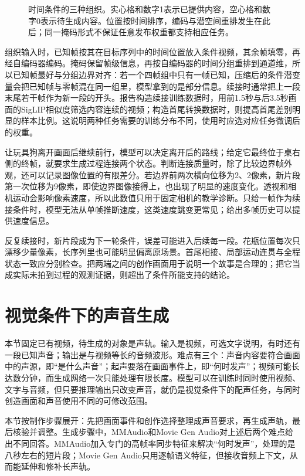 \begin{figure}[htbp]
  \centering
  
  \caption{时间条件的三种组织。实心格和数字1表示已提供内容，空心格和数字0表示待生成内容。位置按时间排序，编码与潜空间重排发生在此后；同一掩码形式不保证任意发布权重都支持相应任务。}
  \label{fig:vision-time-masks}
\end{figure}
\FloatBarrier

组织输入时，已知帧按其在目标序列中的时间位置放入条件视频，其余帧填零，再经自编码器编码。掩码保留帧级信息，再按自编码器的时间分组重排到通道维，所以已知帧最好与分组边界对齐：若一个四帧组中只有一帧已知，压缩后的条件潜变量会把已知帧与零帧混在同一组里，模型拿到的是部分信息。续接时通常把上一段末尾若干帧作为新一段的开头。报告构造续接训练数据时，用前1.5秒与后3.5秒画面的SigLIP相似度筛选内容连续的视频；构造首尾转换数据时，则提高首尾差别明显的样本比例。这说明两种任务需要的训练分布不同，使用时应选对应任务微调后的权重。

让玩具狗离开画面后继续前行，模型可以决定离开后的路线；给定它最终位于桌右侧的终帧，就要求生成过程连接两个状态。判断连接质量时，除了比较边界帧外观，还可以记录图像位置的有限差分。若边界前两次横向位移为2、2像素，新片段第一次位移为9像素，即使边界图像接得上，也出现了明显的速度变化。透视和相机运动会影响像素速度，所以此数值只用于固定相机的教学诊断。只给一帧作为续接条件时，模型无法从单帧推断速度，这类速度跳变更常见；给出多帧历史可以提供速度信息。

反复续接时，新片段成为下一轮条件，误差可能进入后续每一段。花瓶位置每次只漂移少量像素，长序列里也可能明显偏离原场景。首尾相接、局部运动连贯与全程状态一致应分别检查。把两端之间的创作画面用于说明一个故事是合理的；把它当成实际未拍到过程的观测证据，则超出了条件所能支持的结论。

\section{视觉条件下的声音生成}
\label{sec:vision-multigen-audio}

本节固定已有视频，待生成的对象是声轨。输入是视频，可选文字说明，有时还有一段已知声音；输出是与视频等长的音频波形。难点有三个：声音内容要符合画面中的声源，即“是什么声音”；起声要落在画面事件上，即“何时发声”；视频可能长达数分钟，而生成网络一次只能处理有限长度。模型可以在训练时同时使用视频、文字与音频，但只要推理输出只改变声音，就仍是视觉条件下的配声任务，与同时创造画面和声音使用不同的可修改范围。

本节按制作步骤展开：先把画面事件和创作选择整理成声音要求，再生成声轨，最后核验并调整。生成步骤中，MMAudio和Movie Gen Audio对上述后两个难点给出不同回答。MMAudio加入专门的高帧率同步特征来解决“何时发声”，处理的是八秒左右的短片段；Movie Gen Audio只用逐帧语义特征，但接收音频上下文，从而能延伸和修补长声轨。

